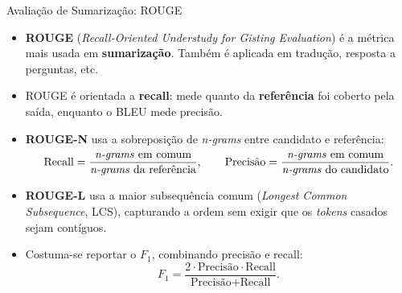 \documentclass[aspectratio=169,xcolor=dvipsnames]{beamer}
\begin{document}
\begin{frame}{Avaliação de Sumarização: ROUGE}
\begin{itemize}
    \item \textbf{ROUGE} (\textit{Recall-Oriented Understudy for Gisting Evaluation}) é a métrica mais usada em \textbf{sumarização}. Também é aplicada em tradução, resposta a perguntas, etc.
    \item ROUGE é orientada a \textbf{recall}: mede quanto da \textbf{referência} foi coberto pela saída, enquanto o BLEU mede precisão.
    \item \textbf{ROUGE-N} usa a sobreposição de \textit{n-grams} entre candidato e referência:
    \begin{equation*}
        \text{Recall} = \frac{\text{\textit{n-grams} em comum}}{\text{\textit{n-grams} da referência}}, \qquad
        \text{Precisão} = \frac{\text{\textit{n-grams} em comum}}{\text{\textit{n-grams} do candidato}}.
    \end{equation*}
    \item \textbf{ROUGE-L} usa a maior subsequência comum (\textit{Longest Common Subsequence}, LCS), capturando a ordem sem exigir que os \textit{tokens} casados sejam contíguos.
    \item Costuma-se reportar o \textbf{$F_1$}, combinando precisão e recall:
    \begin{equation*}
        F_1 = \frac{2 \cdot \text{Precisão} \cdot \text{Recall}}{\text{Precisão} + \text{Recall}}.
    \end{equation*}
\end{itemize}
\end{frame}
\end{document}

